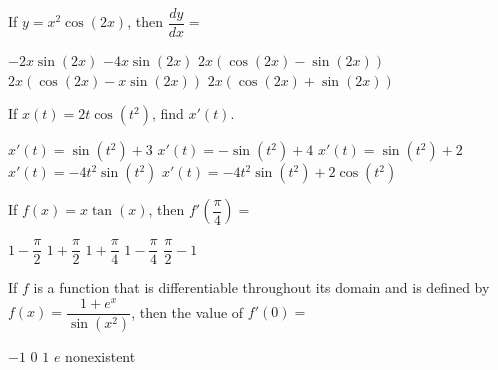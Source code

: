 \begin{questions}
    \question If $y = x^2\cos (2x)$, then $\dfrac{dy}{dx} = $ \\

    \begin{oneparchoices}
        \choice $-2x\sin (2x)$
        \choice $-4x\sin (2x)$
        \choice $2x\left(\cos (2x) - \sin (2x)\right)$ \\[11pt]
        \makebox[0.17 \textwidth] \choice $2x\left(\cos (2x) - x\sin (2x)\right)$
        \makebox[0.2 \textwidth] \choice $2x\left(\cos (2x) + \sin (2x)\right)$
    \end{oneparchoices} \par \horizontalline

    \question If $x(t) = 2t\cos \left(t^2\right)$, find $x'(t)$. \\

    \begin{oneparchoices}
        \choice $x'(t) = \sin \left(t^2\right) + 3$
        \choice $x'(t) = -\sin \left(t^2\right) + 4$ 
        \choice $x'(t) = \sin \left(t^2\right) + 2$ \\[11pt]
        \makebox[0.14 \textwidth] \choice $x'(t) = -4t^2\sin \left(t^2\right)$ 
        \makebox[0.15 \textwidth] \choice $x'(t) = -4t^2\sin \left(t^2\right) + 2\cos \left(t^2\right)$ 
    \end{oneparchoices} \par \horizontalline

    \question If $f(x) = x\tan (x)$, then $f'\left(\dfrac{\pi}{4}\right) = $ \\

    \begin{oneparchoices}
        \choice $1 - \dfrac{\pi}{2}$ 
        \choice $1 + \dfrac{\pi}{2}$
        \choice $1 + \dfrac{\pi}{4}$
        \choice $1 - \dfrac{\pi}{4}$ 
        \choice $\dfrac{\pi}{2} - 1$
    \end{oneparchoices} \par \horizontalline

    \question If $f$ is a function that is differentiable throughout its domain and is defined by $f(x) = \dfrac{1 + e^x}{\sin \left(x^2\right)}$, then the value of $f'(0) = $ \\

    \begin{oneparchoices}
        \choice $-1$ 
        \choice $0$
        \choice $1$
        \choice $e$
        \choice nonexistent
    \end{oneparchoices} \par \horizontalline
    

\end{questions}
